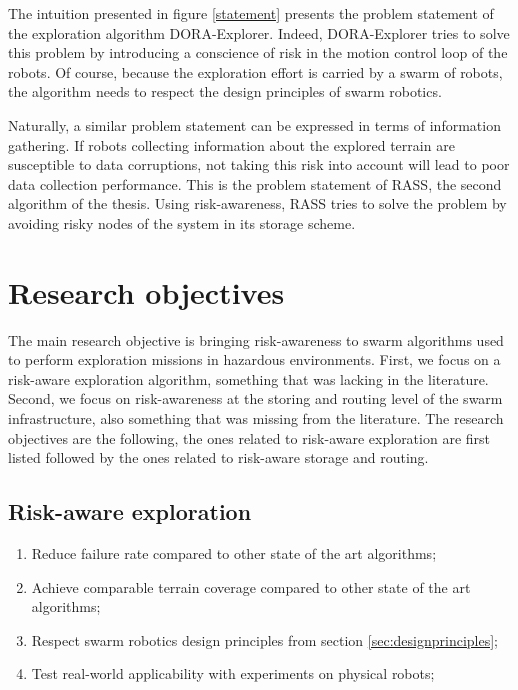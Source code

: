 The intuition presented in figure \ref{statement} presents the problem statement of the exploration algorithm DORA-Explorer. Indeed, DORA-Explorer tries to solve this problem by introducing a conscience of risk in the motion control loop of the robots. Of course, because the exploration effort is carried by a swarm of robots, the algorithm needs to respect the design principles of swarm robotics.

Naturally, a similar problem statement can be expressed in terms of information gathering. If robots collecting information about the explored terrain are susceptible to data corruptions, not taking this risk into account will lead to poor data collection performance. This is the problem statement of RASS, the second algorithm of the thesis. Using risk-awareness, RASS tries to solve the problem by avoiding risky nodes of the system in its storage scheme.

\section{Research objectives} 
\label{sec:objectifs}
The main research objective is bringing risk-awareness to swarm algorithms used to perform exploration missions in hazardous environments. First, we focus on a risk-aware exploration algorithm, something that was lacking in the literature. Second, we focus on risk-awareness at the storing and routing level of the swarm infrastructure, also something that was missing from the literature. The research objectives are the following, the ones related to risk-aware exploration are first listed followed by the ones related to risk-aware storage and routing.


\subsection{Risk-aware exploration}
\begin{enumerate}
    \item Reduce failure rate compared to other state of the art algorithms;
    \item Achieve comparable terrain coverage compared to other state of the art algorithms;
    \item Respect swarm robotics design principles from section \ref{sec:designprinciples};
    \item Test real-world applicability with experiments on physical robots;
\end{enumerate}

